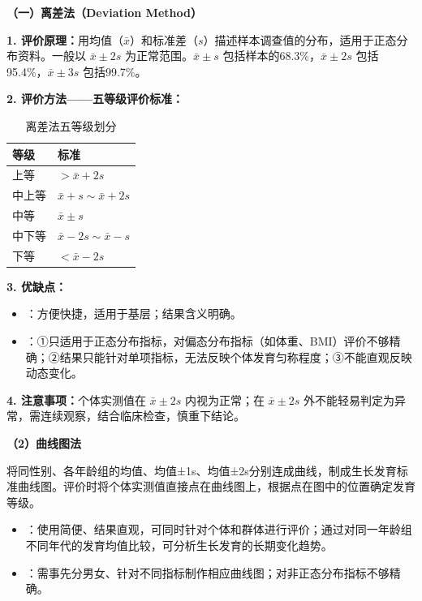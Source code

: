 \begin{keybox}
\textbf{（一）离差法（Deviation Method）}

\textbf{1. 评价原理：}用均值（$\bar{x}$）和标准差（$s$）描述样本调查值的分布，适用于正态分布资料。一般以 $\bar{x} \pm 2s$ 为正常范围。$\bar{x} \pm s$ 包括样本的68.3\%，$\bar{x} \pm 2s$ 包括95.4\%，$\bar{x} \pm 3s$ 包括99.7\%。

\textbf{2. 评价方法——五等级评价标准：}

\begin{table}[H]
\centering
\caption{离差法五等级划分}
\begin{tabularx}{\textwidth}{ll}
\hline
\textbf{等级} & \textbf{标准} \\
\hline
上等   & $> \bar{x} + 2s$ \\
中上等 & $\bar{x} + s \sim \bar{x} + 2s$ \\
中等   & $\bar{x} \pm s$ \\
中下等 & $\bar{x} - 2s \sim \bar{x} - s$ \\
下等   & $< \bar{x} - 2s$ \\
\hline
\end{tabularx}
\end{table}

\textbf{3. 优缺点：}

\begin{itemize}[leftmargin=*]
    \item {}：方便快捷，适用于基层；结果含义明确。
    \item {}：①只适用于正态分布指标，对偏态分布指标（如体重、BMI）评价不够精确；②结果只能针对单项指标，无法反映个体发育匀称程度；③不能直观反映动态变化。
\end{itemize}

\textbf{4. 注意事项：}个体实测值在 $\bar{x} \pm 2s$ 内视为正常；在 $\bar{x} \pm 2s$ 外不能轻易判定为异常，需连续观察，结合临床检查，慎重下结论。

\textbf{（2）曲线图法}

将同性别、各年龄组的均值、均值±1s、均值±2s分别连成曲线，制成生长发育标准曲线图。评价时将个体实测值直接点在曲线图上，根据点在图中的位置确定发育等级。

\begin{itemize}[leftmargin=*]
    \item {}：使用简便、结果直观，可同时针对个体和群体进行评价；通过对同一年龄组不同年代的发育均值比较，可分析生长发育的长期变化趋势。
    \item {}：需事先分男女、针对不同指标制作相应曲线图；对非正态分布指标不够精确。
\end{itemize}


\end{keybox}
